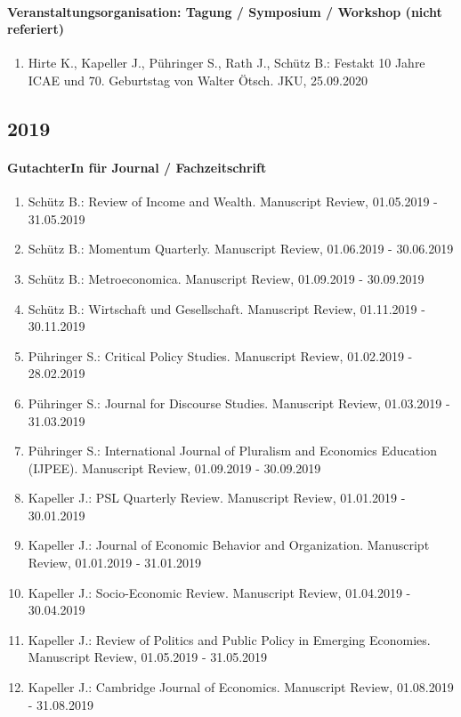 \paragraph{Veranstaltungsorganisation: Tagung / Symposium / Workshop (nicht referiert)}
\begin{enumerate}[leftmargin=*, labelsep=0.5cm]
\item Hirte K., Kapeller J., Pühringer S., Rath J., Schütz B.: Festakt 10 Jahre ICAE und 70. Geburtstag von Walter Ötsch. JKU, 25.09.2020
\end{enumerate}\subsection*{2019}\paragraph{GutachterIn für Journal / Fachzeitschrift}
\begin{enumerate}[leftmargin=*, labelsep=0.5cm]
\item Schütz B.: Review of Income and Wealth. Manuscript Review, 01.05.2019 - 31.05.2019
\item Schütz B.: Momentum Quarterly. Manuscript Review, 01.06.2019 - 30.06.2019
\item Schütz B.: Metroeconomica. Manuscript Review, 01.09.2019 - 30.09.2019
\item Schütz B.: Wirtschaft und Gesellschaft. Manuscript Review, 01.11.2019 - 30.11.2019
\item Pühringer S.: Critical Policy Studies. Manuscript Review, 01.02.2019 - 28.02.2019
\item Pühringer S.: Journal for Discourse Studies. Manuscript Review, 01.03.2019 - 31.03.2019
\item Pühringer S.: International Journal of Pluralism and Economics Education (IJPEE). Manuscript Review, 01.09.2019 - 30.09.2019
\item Kapeller J.: PSL Quarterly Review. Manuscript Review, 01.01.2019 - 30.01.2019
\item Kapeller J.: Journal of Economic Behavior and Organization. Manuscript Review, 01.01.2019 - 31.01.2019
\item Kapeller J.: Socio-Economic Review. Manuscript Review, 01.04.2019 - 30.04.2019
\item Kapeller J.: Review of Politics and Public Policy in Emerging Economies. Manuscript Review, 01.05.2019 - 31.05.2019
\item Kapeller J.: Cambridge Journal of Economics. Manuscript Review, 01.08.2019 - 31.08.2019
\end{enumerate}
